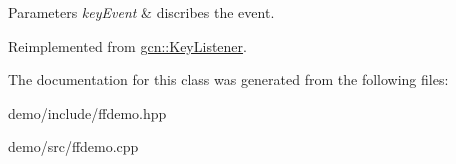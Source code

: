 \begin{DoxyParams}{Parameters}
{\em key\+Event} & discribes the event. \\
\hline
\end{DoxyParams}


Reimplemented from \hyperlink{classgcn_1_1KeyListener_ada6c0d038340d6ee674702268b2d2c67}{gcn\+::\+Key\+Listener}.



The documentation for this class was generated from the following files\+:\begin{DoxyCompactItemize}
\item 
demo/include/ffdemo.\+hpp\item 
demo/src/ffdemo.\+cpp\end{DoxyCompactItemize}
